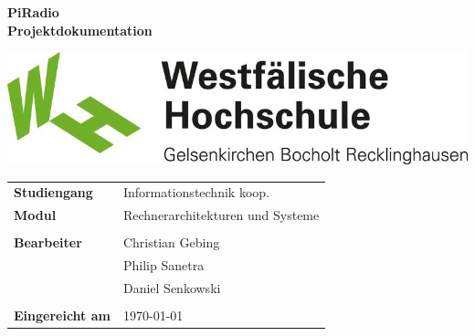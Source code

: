 \thispagestyle{empty}
\begin{center}
\textbf{\Large{PiRadio}}\\\vspace{1cm}
\textbf{Projektdokumentation}\\[3cm]
\end{center}
\includegraphics[width=\textwidth]{WH_Logo.jpg}

\vfill
\begin{center}
\begin{tabular}{ll}
\textbf{Studiengang} & Informationstechnik koop. \\
\textbf{Modul} & Rechnerarchitekturen und Systeme\\
& \\
\textbf{Bearbeiter} & Christian Gebing \\
\textbf & Philip Sanetra \\
\textbf & Daniel Senkowski \\
& \\
\textbf{Eingereicht am} & \today\\
\end{tabular}
\end{center}